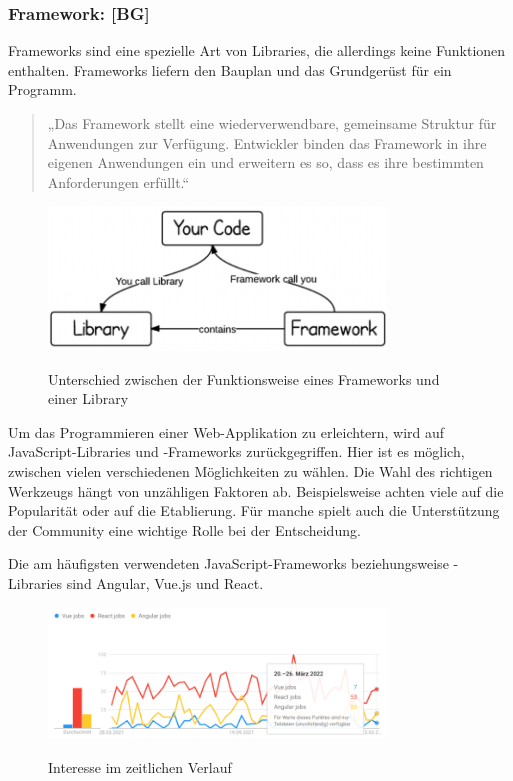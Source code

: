 \subsubsection{Framework: [BG]}

Frameworks sind eine spezielle Art von Libraries, die allerdings keine Funktionen enthalten. Frameworks liefern den Bauplan und das Grundgerüst für ein Programm.

\cite{LibFramw}

\begin{quote}
  „Das Framework stellt eine wiederverwendbare, gemeinsame Struktur für Anwendungen zur Verfügung. Entwickler binden das Framework in ihre eigenen Anwendungen ein und erweitern es so, dass es ihre bestimmten Anforderungen erfüllt.“
\end{quote} \cite{framevsL2}

\begin{figure}[H]
  \centering
  \includegraphics[width=0.8\textwidth]{pics/LibraryFramework.png}
  \caption{Unterschied zwischen der Funktionsweise eines Frameworks und einer Library}
  \cite{LibFramwImage}
\end{figure}

Um das Programmieren einer Web-Applikation zu erleichtern, wird auf JavaScript-Libraries und -Frameworks zurückgegriffen. Hier ist es möglich, zwischen vielen verschiedenen Möglichkeiten zu wählen. Die Wahl des richtigen Werkzeugs hängt von unzähligen Faktoren ab. Beispielsweise achten viele auf die Popularität oder auf die Etablierung. Für manche spielt auch die Unterstützung der Community eine wichtige Rolle bei der Entscheidung.

Die am häufigsten verwendeten JavaScript-Frameworks beziehungsweise -Libraries sind Angular, Vue.js und React.
\cite{framevsL2}

\begin{figure}[H]
  \centering
  \includegraphics[width=0.8\textwidth]{pics/interesseFL.png}
  \caption{Interesse im zeitlichen Verlauf}
  \cite{InteresseGraph}
\end{figure}

